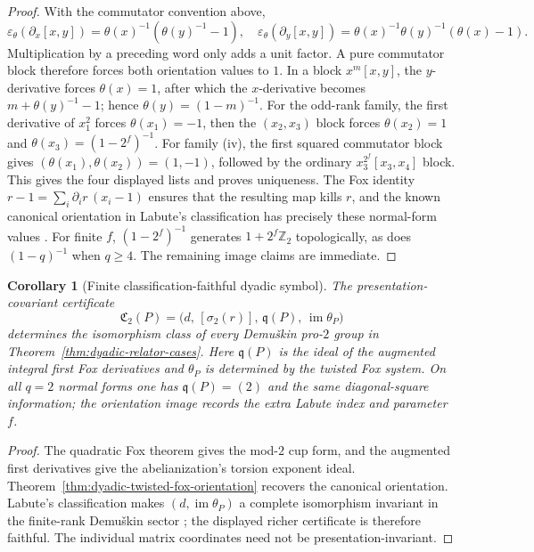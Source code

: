 \documentclass[11pt]{article}
\newtheorem{corollary}[theorem]{Corollary}
\theoremstyle{definition}
\begin{document}
\begin{proof}
With the commutator convention above,
\[
\varepsilon_\theta(\partial_x[x,y])
=\theta(x)^{-1}(\theta(y)^{-1}-1),
\quad
\varepsilon_\theta(\partial_y[x,y])
=\theta(x)^{-1}\theta(y)^{-1}(\theta(x)-1).
\]
Multiplication by a preceding word only adds a unit factor.
A pure commutator block therefore forces both orientation
values to $1$.  In a block $x^m[x,y]$, the $y$-derivative
forces $\theta(x)=1$, after which the $x$-derivative
becomes $m+\theta(y)^{-1}-1$; hence
$\theta(y)=(1-m)^{-1}$.
For the odd-rank family, the first derivative of $x_1^2$
forces $\theta(x_1)=-1$, then the $(x_2,x_3)$ block
forces $\theta(x_2)=1$ and
$\theta(x_3)=(1-2^f)^{-1}$.
For family (iv), the first squared commutator block gives
$(\theta(x_1),\theta(x_2))=(1,-1)$,
followed by the ordinary $x_3^{2^f}[x_3,x_4]$ block.
This gives the four displayed lists and proves uniqueness.
The Fox identity $r-1=\sum_i\partial_i r\,(x_i-1)$
ensures that the resulting map kills $r$, and
the known canonical orientation in Labute's classification
has precisely these normal-form values
\cite{LabuteClassification,NSW}.
For finite $f$, $(1-2^f)^{-1}$ generates
$1+2^f\mathbb Z_2$ topologically, as does
$(1-q)^{-1}$ when $q\ge4$.
The remaining image claims are immediate.
\end{proof}

\begin{corollary}[Finite classification-faithful dyadic symbol]
\label{thm:dyadic-classification-certificate}
The presentation-covariant certificate
\begin{equation}\label{eq:dyadic-classification-certificate}
\boxed{\quad
\mathfrak C_2(P)=
\bigl(d,\,[\sigma_2(r)],\,
\mathfrak q(P),\,\operatorname{im}\theta_P\bigr)
\quad}
\end{equation}
determines the isomorphism class of every
Demu\v{s}kin pro-$2$ group in
Theorem~\ref{thm:dyadic-relator-cases}.
Here $\mathfrak q(P)$ is the ideal of the augmented
integral first Fox derivatives and $\theta_P$
is determined by the twisted Fox system.
On all $q=2$ normal forms one has
$\mathfrak q(P)=(2)$ and the same diagonal-square
information; the orientation image records the extra
Labute index and parameter $f$.
\end{corollary}

\begin{proof}
The quadratic Fox theorem gives the mod-$2$ cup form,
and the augmented first derivatives give the
abelianization's torsion exponent ideal.
Theorem~\ref{thm:dyadic-twisted-fox-orientation}
recovers the canonical orientation.
Labute's classification makes $(d,\operatorname{im}\theta_P)$
a complete isomorphism invariant in the finite-rank
Demu\v{s}kin sector \cite{LabuteClassification};
the displayed richer certificate is therefore faithful.
The individual matrix coordinates need not be
presentation-invariant.
\end{proof}
\end{document}
